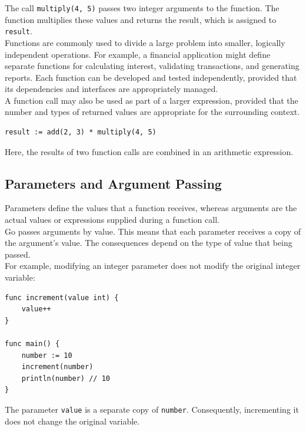 The call \texttt{multiply(4, 5)} passes two integer arguments to the function. The function multiplies these values and returns the result, which is assigned to \texttt{result}.\\

Functions are commonly used to divide a large problem into smaller, logically independent operations. For example, a financial application might define separate functions for calculating interest, validating transactions, and generating reports. Each function can be developed and tested independently, provided that its dependencies and interfaces are appropriately managed.\\

A function call may also be used as part of a larger expression, provided that the number and types of returned values are appropriate for the surrounding context.

\begin{lstlisting}
result := add(2, 3) * multiply(4, 5)
\end{lstlisting}

Here, the results of two function calls are combined in an arithmetic expression.

\subsection{Parameters and Argument Passing}

Parameters define the values that a function receives, whereas arguments are the actual values or expressions supplied during a function call.\\

Go passes arguments by value. This means that each parameter receives a copy of the argument's value. The consequences depend on the type of value that being passed.\\

For example, modifying an integer parameter does not modify the original integer variable:

\begin{lstlisting}
func increment(value int) {
    value++
}

func main() {
    number := 10
    increment(number)
    println(number) // 10
}
\end{lstlisting}

The parameter \texttt{value} is a separate copy of \texttt{number}. Consequently, incrementing it does not change the original variable.\\

